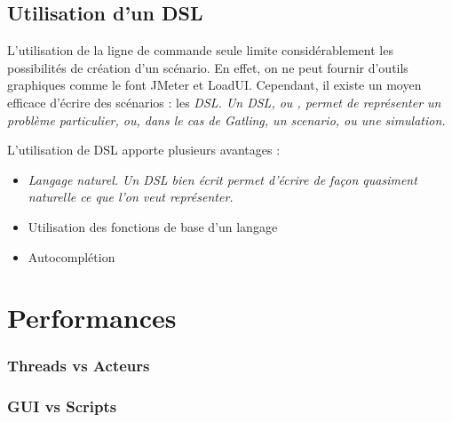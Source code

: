 \subsection{Utilisation d'un DSL}
L'utilisation de la ligne de commande seule limite considérablement les possibilités de création d'un scénario. En effet, on ne peut fournir d'outils graphiques comme le font JMeter et LoadUI. Cependant, il existe un moyen efficace d'écrire des scénarios : les \em{DSL}. Un DSL, ou , permet de représenter un problème particulier, ou, dans le cas de Gatling, un scenario, ou une simulation.

L'utilisation de DSL apporte plusieurs avantages :
\begin{itemize}
  \item \em{Langage naturel}. Un DSL bien écrit permet d'écrire de façon quasiment naturelle ce que l'on veut représenter.
  \item Utilisation des fonctions de base d'un langage
  \item Autocomplétion
\end{itemize}



\section{Performances}

\subsubsection{Threads vs Acteurs}
\subsubsection{GUI vs Scripts}